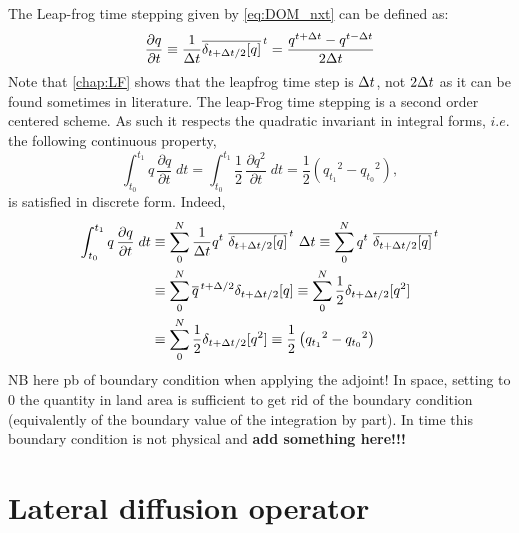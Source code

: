 \documentclass[../tex_main/NEMO_manual]{subfiles}
\begin{document}
The Leap-frog time stepping given by \autoref{eq:DOM_nxt} can be defined as:
\begin{equation} \label{eq:LF}
   \frac{\partial q}{\partial t} 
   		\equiv \frac{1}{\Delta t} \overline{ \delta _{t+\Delta t/2}[q]}^{\,t} 
		=         \frac{q^{t+\Delta t}-q^{t-\Delta t}}{2\Delta t}
\end{equation} 
Note that \autoref{chap:LF} shows that the leapfrog time step is $\Delta t$,
not $2\Delta t$ as it can be found sometimes in literature.
The leap-Frog time stepping is a second order centered scheme.
As such it respects the quadratic invariant in integral forms, $i.e.$ the following continuous property,
\begin{equation} \label{eq:Energy}
\int_{t_0}^{t_1} {q\, \frac{\partial q}{\partial t} \;dt} 
	=\int_{t_0}^{t_1} {\frac{1}{2}\, \frac{\partial q^2}{\partial t} \;dt} 
	=  \frac{1}{2} \left( {q_{t_1}}^2 - {q_{t_0}}^2 \right) ,
\end{equation}
is satisfied in discrete form.
Indeed, 
\begin{equation} \begin{split}
\int_{t_0}^{t_1} {q\, \frac{\partial q}{\partial t} \;dt} 
	&\equiv \sum\limits_{0}^{N} 
			{\frac{1}{\Delta t} q^t \ \overline{ \delta _{t+\Delta t/2}[q]}^{\,t} \ \Delta t} 
	   \equiv \sum\limits_{0}^{N}  { q^t \ \overline{ \delta _{t+\Delta t/2}[q]}^{\,t} } \\
	&\equiv \sum\limits_{0}^{N}  { \overline{q}^{\,t+\Delta/2}{ \delta _{t+\Delta t/2}[q]}}
	   \equiv \sum\limits_{0}^{N}  { \frac{1}{2} \delta _{t+\Delta t/2}[q^2] }\\
	&\equiv \sum\limits_{0}^{N}  { \frac{1}{2} \delta _{t+\Delta t/2}[q^2] }
	   \equiv \frac{1}{2} \left( {q_{t_1}}^2 - {q_{t_0}}^2 \right)
\end{split} \end{equation}
NB here pb of boundary condition when applying the adjoint!
In space, setting to 0 the quantity in land area is sufficient to get rid of the boundary condition 
(equivalently of the boundary value of the integration by part).
In time this boundary condition is not physical and \textbf{add something here!!!}







\section{Lateral diffusion operator}
\end{document}
